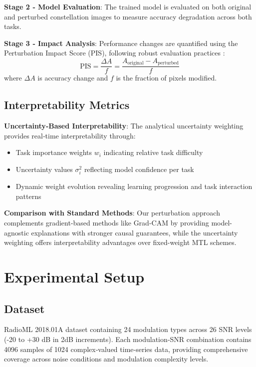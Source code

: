 \documentclass{ELSP}
\begin{document}
\textbf{Stage 2 ‑ Model Evaluation}: The trained model is evaluated on both original and perturbed constellation images to measure accuracy degradation across both tasks.

\textbf{Stage 3 ‑ Impact Analysis}: Performance changes are quantified using the Perturbation Impact Score (PIS), following robust evaluation practices \cite{fel2023don}:
\begin{equation}
\text{PIS} = \frac{\Delta A}{f} = \frac{A_{\text{original}} - A_{\text{perturbed}}}{f}
\end{equation}
where $\Delta A$ is accuracy change and $f$ is the fraction of pixels modified.

\subsection{Interpretability Metrics}

\textbf{Uncertainty‑Based Interpretability}: The analytical uncertainty weighting provides real‑time interpretability through:
\begin{itemize}
\item Task importance weights $w_i$ indicating relative task difficulty
\item Uncertainty values $\sigma_i^2$ reflecting model confidence per task
\item Dynamic weight evolution revealing learning progression and task interaction patterns
\end{itemize}

\textbf{Comparison with Standard Methods}: Our perturbation approach complements gradient-based methods like Grad-CAM \cite{selvaraju2017grad} by providing model-agnostic explanations with stronger causal guarantees, while the uncertainty weighting offers interpretability advantages over fixed-weight MTL schemes.

\section{Experimental Setup}

\subsection{Dataset}
RadioML 2018.01A dataset containing 24 modulation types across 26 SNR levels (-20 to +30 dB in 2dB increments). Each modulation‑SNR combination contains 4096 samples of 1024 complex‑valued time‑series data, providing comprehensive coverage across noise conditions and modulation complexity levels.
\end{document}
